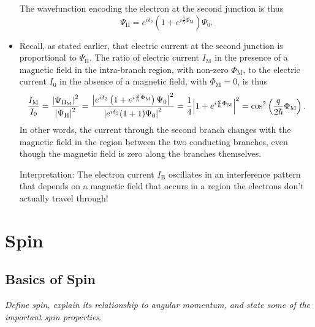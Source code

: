 \documentclass[11pt, a4paper]{article}
\renewcommand{\P}{\Psi}  %
\begin{document}
\begin{itemize}
	The wavefunction encoding the electron at the second junction is thus
	\begin{equation*}
		\P_{\text{II}} = e^{i\delta_{2}}\left(1 + e^{i\frac{q}{\hbar}\Phi_{\text{M}}}\right)\P_{0}.
	\end{equation*}
	
	\item Recall, as stated earlier, that electric current at the second junction is proportional to $ \Psi_{\text{II}} $. The ratio of electric current $ I_{\text{M}} $ in the presence of a magnetic field in the intra-branch region, with non-zero $ \Phi_{\text{M}} $, to the electric current $ I_{0} $ in the absence of a magnetic field, with $ \Phi_{\text{M}} = 0 $, is thus
	\begin{equation*}
		\frac{I_{\text{M}}}{I_{0}} = \frac{\abs{\P_{\text{II}_{\text{M}}}}^{2}}{\abs{\P_{\text{II}}}^{2}} = \frac{\abs{e^{i\delta_{2}}\left(1 + e^{i\frac{q}{\hbar}\Phi_{\text{M}}}\right)\P_{0}}^{2}}{\abs{e^{i\delta_{2}}(1 + 1)\P_{0}}^{2}} = \frac{1}{4}\abs{1 + e^{i\frac{q}{\hbar}\Phi_{\text{M}}}}^{2} = \cos^{2}\left(\frac{q}{2\hbar}\Phi_{\text{M}}\right).
	\end{equation*}
	In other words, the current through the second branch changes with the magnetic field in the region between the two conducting branches, even though the magnetic field is zero along the branches themselves. 
	
	Interpretation: The electron current $ I_{\text{B}} $ oscillates in an interference pattern that depends on a magnetic field that occurs in a region the electrons don't actually travel through!
\end{itemize}


	
\newpage
\section{Spin}


\subsection{Basics of Spin} \label{ss:spin-basics}
\textit{Define spin, explain its relationship to angular momentum, and state some of the important spin properties.}
\end{document}
